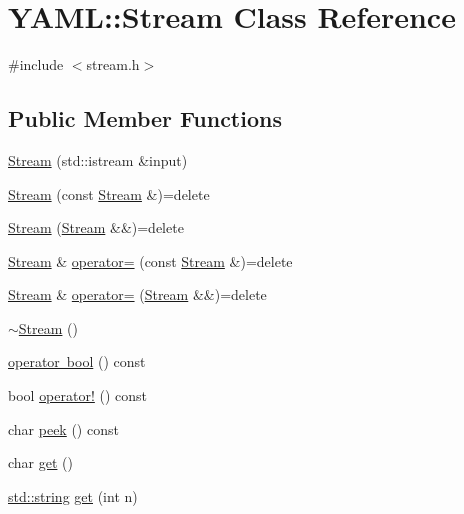 \hypertarget{class_y_a_m_l_1_1_stream}{}\section{Y\+A\+ML\+::Stream Class Reference}
\label{class_y_a_m_l_1_1_stream}


{\ttfamily \#include $<$stream.\+h$>$}

\subsection*{Public Member Functions}
\begin{DoxyCompactItemize}
\item 
\mbox{\hyperlink{class_y_a_m_l_1_1_stream_af1df4e8380675578b48f45b2c2757701}{Stream}} (std\+::istream \&input)
\item 
\mbox{\hyperlink{class_y_a_m_l_1_1_stream_a0ef2538bae425bf413f0130290f30da9}{Stream}} (const \mbox{\hyperlink{class_y_a_m_l_1_1_stream}{Stream}} \&)=delete
\item 
\mbox{\hyperlink{class_y_a_m_l_1_1_stream_a4e4cb943155e16a6fc215ccfe786cc0c}{Stream}} (\mbox{\hyperlink{class_y_a_m_l_1_1_stream}{Stream}} \&\&)=delete
\item 
\mbox{\hyperlink{class_y_a_m_l_1_1_stream}{Stream}} \& \mbox{\hyperlink{class_y_a_m_l_1_1_stream_aa92d3c7a073a05f48da64369a676fa7b}{operator=}} (const \mbox{\hyperlink{class_y_a_m_l_1_1_stream}{Stream}} \&)=delete
\item 
\mbox{\hyperlink{class_y_a_m_l_1_1_stream}{Stream}} \& \mbox{\hyperlink{class_y_a_m_l_1_1_stream_a133f14ef5c79b29024c91de47d8013cd}{operator=}} (\mbox{\hyperlink{class_y_a_m_l_1_1_stream}{Stream}} \&\&)=delete
\item 
\mbox{\hyperlink{class_y_a_m_l_1_1_stream_a3d32d1c9e0091000a21494379d2812c7}{$\sim$\+Stream}} ()
\item 
\mbox{\hyperlink{class_y_a_m_l_1_1_stream_add3d15ba6db6d1b6d84294fbe6534d31}{operator bool}} () const
\item 
bool \mbox{\hyperlink{class_y_a_m_l_1_1_stream_a62b4d0c8b6d764d75e8d5359b4dce670}{operator!}} () const
\item 
char \mbox{\hyperlink{class_y_a_m_l_1_1_stream_ab131746d2a9bb7bf8ab8765d16445fbc}{peek}} () const
\item 
char \mbox{\hyperlink{class_y_a_m_l_1_1_stream_a98a6753995450fd1af5b9069da66e3a5}{get}} ()
\item 
\mbox{\hyperlink{glad_8h_ac83513893df92266f79a515488701770}{std\+::string}} \mbox{\hyperlink{class_y_a_m_l_1_1_stream_acaf227379d8db9ee00f646e009d6d2af}{get}} (int n)

\end{DoxyCompactItemize}
